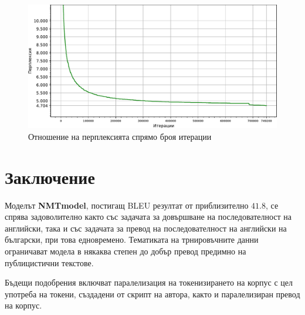 \documentclass[12pt,oneside,a4paper]{article}
\begin{document}
	\begin{figure}[ht]
		\centering
		\includegraphics[width=0.9\linewidth]{perplexity.pdf}
		\caption{Отношение на перплексията спрямо броя итерации}
		\label{fig:perplexity}
	\end{figure}
	
	\section{Заключение}
	
	Моделът \textbf{NMTmodel}, постигащ BLEU резултат от приблизително $41.8$, се спрява задоволително както със задачата за довършване на последователност на английски, така и със задачата за превод на последователност на английски на български, при това едновремено. Тематиката на трнировъчните данни ограничават модела в някаква степен до добър превод предимно на публицистични текстове.
	
	Бъдещи подобрения включват паралелизация на токенизирането на корпус с цел употреба на токени, създадени от скрипт на автора, както и паралелизиран превод на корпус.
	
	
	
\end{document}
